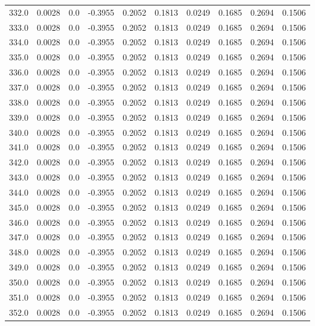 \begin{longtable}{lrrrrrrrrr}
332.0 & 0.0028 & 0.0 & -0.3955 & 0.2052 & 0.1813 & 0.0249 & 0.1685 & 0.2694 & 0.1506 \\
333.0 & 0.0028 & 0.0 & -0.3955 & 0.2052 & 0.1813 & 0.0249 & 0.1685 & 0.2694 & 0.1506 \\
334.0 & 0.0028 & 0.0 & -0.3955 & 0.2052 & 0.1813 & 0.0249 & 0.1685 & 0.2694 & 0.1506 \\
335.0 & 0.0028 & 0.0 & -0.3955 & 0.2052 & 0.1813 & 0.0249 & 0.1685 & 0.2694 & 0.1506 \\
336.0 & 0.0028 & 0.0 & -0.3955 & 0.2052 & 0.1813 & 0.0249 & 0.1685 & 0.2694 & 0.1506 \\
337.0 & 0.0028 & 0.0 & -0.3955 & 0.2052 & 0.1813 & 0.0249 & 0.1685 & 0.2694 & 0.1506 \\
338.0 & 0.0028 & 0.0 & -0.3955 & 0.2052 & 0.1813 & 0.0249 & 0.1685 & 0.2694 & 0.1506 \\
339.0 & 0.0028 & 0.0 & -0.3955 & 0.2052 & 0.1813 & 0.0249 & 0.1685 & 0.2694 & 0.1506 \\
340.0 & 0.0028 & 0.0 & -0.3955 & 0.2052 & 0.1813 & 0.0249 & 0.1685 & 0.2694 & 0.1506 \\
341.0 & 0.0028 & 0.0 & -0.3955 & 0.2052 & 0.1813 & 0.0249 & 0.1685 & 0.2694 & 0.1506 \\
342.0 & 0.0028 & 0.0 & -0.3955 & 0.2052 & 0.1813 & 0.0249 & 0.1685 & 0.2694 & 0.1506 \\
343.0 & 0.0028 & 0.0 & -0.3955 & 0.2052 & 0.1813 & 0.0249 & 0.1685 & 0.2694 & 0.1506 \\
344.0 & 0.0028 & 0.0 & -0.3955 & 0.2052 & 0.1813 & 0.0249 & 0.1685 & 0.2694 & 0.1506 \\
345.0 & 0.0028 & 0.0 & -0.3955 & 0.2052 & 0.1813 & 0.0249 & 0.1685 & 0.2694 & 0.1506 \\
346.0 & 0.0028 & 0.0 & -0.3955 & 0.2052 & 0.1813 & 0.0249 & 0.1685 & 0.2694 & 0.1506 \\
347.0 & 0.0028 & 0.0 & -0.3955 & 0.2052 & 0.1813 & 0.0249 & 0.1685 & 0.2694 & 0.1506 \\
348.0 & 0.0028 & 0.0 & -0.3955 & 0.2052 & 0.1813 & 0.0249 & 0.1685 & 0.2694 & 0.1506 \\
349.0 & 0.0028 & 0.0 & -0.3955 & 0.2052 & 0.1813 & 0.0249 & 0.1685 & 0.2694 & 0.1506 \\
350.0 & 0.0028 & 0.0 & -0.3955 & 0.2052 & 0.1813 & 0.0249 & 0.1685 & 0.2694 & 0.1506 \\
351.0 & 0.0028 & 0.0 & -0.3955 & 0.2052 & 0.1813 & 0.0249 & 0.1685 & 0.2694 & 0.1506 \\
352.0 & 0.0028 & 0.0 & -0.3955 & 0.2052 & 0.1813 & 0.0249 & 0.1685 & 0.2694 & 0.1506 \\

\end{longtable}
